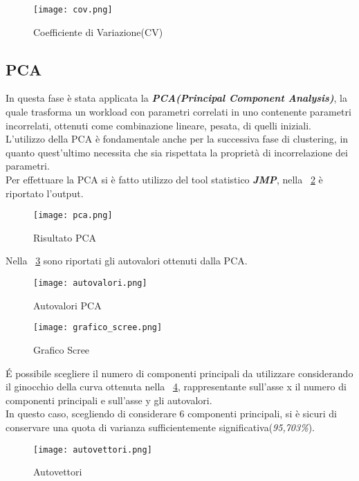 \begin{figure}[!htbp]
  \centering
	\texttt{[image: cov.png]}
  \caption{Coefficiente di Variazione(CV)}
  \label{cv}
\end{figure}
\clearpage

\subsection{PCA}
In questa fase è stata applicata la
\textbf{\textit{PCA(Principal Component Analysis)}},
la quale trasforma un workload con parametri correlati in uno contenente parametri
incorrelati, ottenuti come combinazione lineare, pesata, di quelli iniziali.\\
L'utilizzo della PCA è fondamentale anche per la successiva fase di clustering, in
quanto quest'ultimo necessita che sia rispettata la proprietà di incorrelazione
dei parametri.\\
Per effettuare la PCA si è fatto utilizzo del tool statistico \textit{\textbf{JMP}}, nella
\figurename~\ref{pca} è riportato l'output.\\

\begin{figure}[!htbp]
	\texttt{[image: pca.png]}
  \caption{Risultato PCA}
  \label{pca}
\end{figure}

\clearpage

Nella \figurename~\ref{autovalori} sono riportati gli autovalori ottenuti dalla PCA.\\

\begin{figure}[!htbp]
	\texttt{[image: autovalori.png]}
  \caption{Autovalori PCA}
  \label{autovalori}
\end{figure}

\clearpage

\begin{figure}[!htbp]
	\texttt{[image: grafico\_scree.png]}
  \caption{Grafico Scree}
  \label{grafico_scree}
\end{figure}

\'E possibile scegliere il numero di componenti principali da utilizzare considerando
il ginocchio della curva ottenuta nella \figurename~\ref{grafico_scree}, rappresentante
sull'asse x il numero di componenti principali e sull'asse y
gli autovalori.\\
In questo caso, scegliendo di considerare 6 componenti principali, si è sicuri di conservare una quota di varianza sufficientemente
significativa(\textit{95,703\%}).\\
\clearpage
\begin{figure}[!htbp]
	\texttt{[image: autovettori.png]}
  \caption{Autovettori}
  \label{autovettori}
\end{figure}


